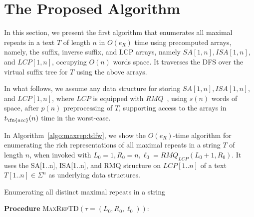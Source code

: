 


\section{The Proposed Algorithm}
\label{sec:algo}

In this section, we present the first algorithm that enumerates all maximal repeats in a text $T$ of length $n$ in $O(e_R)$ time
using precomputed arrays, namely, the suffix, inverse suffix, and LCP arrays, namely $SA[1,n], ISA[1,n]$, and $LCP[1,n]$, occupying $O(n)$ words space. It traverses the DFS over the virtual suffix tree for $T$ using the above arrays. 

In what follows, we assume any data structure for storing $SA[1,n], ISA[1,n]$, and $LCP[1,n]$, where $LCP$ is equipped with $RMQ$~\cite{bender:colton2000thelcaproblem}, using $s(n)$ words of space, after $p(n)$ preprocessing of $T$, supporting 
access to the arrays in $t_\fn{acc}(n)$ time in the worst-case. 

In Algorithm~\ref{algo:maxrep:tdfw}, we show the $O(e_R)$-time algorithm for enumerating the rich representations of all maximal repeats in a string $T$ of length $n$, when invoked with $L_0=1, R_0=n, \ell_0= RMQ_{LCP}(L_0+1, R_0)$.
It uses the SA[1..n], ISA[1..n], and RMQ structure on $LCP[1..n]$ of a text $T[1..n] \in \Sigma^n$ as underlying data structures. 

\begin{algorithm}[h]
  \caption{Enumerating all distinct maximal repeats in a string}\label{algo:maxrep:tdfw}
  \textbf{Procedure} \textsc{MaxRepTD}$(\tau = (L_0, R_0, \ell_0))$:\\
\end{algorithm}

